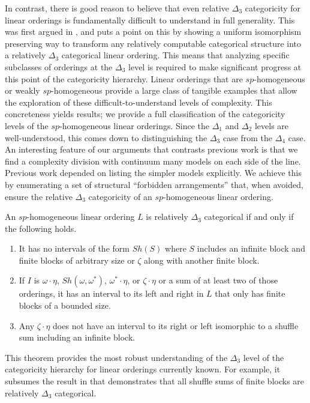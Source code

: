 \documentclass[11pt]{amsart}
\theoremstyle{definition}
\begin{document}
In contrast, there is good reason to believe that even relative $\Delta_3$ categoricity for linear orderings is fundamentally difficult to understand in full generality.
This was first argued in \cite{McCoy2002}, and \cite{GR23} puts a point on this by showing a uniform isomorphism preserving way to transform any relatively computable categorical structure into a relatively $\Delta_3$ categorical linear ordering.
This means that analyzing specific subclasses of orderings at the $\Delta_3$ level is required to make significant progress at this point of the categoricity hierarchy.
Linear orderings that are $sp$-homogeneous or weakly $sp$-homogeneous provide a large class of tangible examples that allow the exploration of these difficult-to-understand levels of complexity.
This concreteness yields results; we provide a full classification of the categoricity levels of the $sp$-homogeneous linear orderings.
Since the $\Delta_1$ and $\Delta_2$ levels are well-understood, this comes down to distinguishing the $\Delta_3$ case from the $\Delta_4$ case.
An interesting feature of our arguments that contrasts previous work is that we find a complexity division with continuum many models on each side of the line.
Previous work depended on listing the simpler models explicitly.
We achieve this by enumerating a set of structural ``forbidden arrangements'' that, when avoided, ensure the relative $\Delta_3$ categoricity of an $sp$-homogeneous linear ordering.
 \begin{theorem}
        An $sp$-homogeneous linear ordering $L$ is relatively $\Delta_3$ categorical if and only if the following holds. 
        \begin{enumerate}
            \item It has no intervals of the form $Sh(S)$ where $S$ includes an infinite block and finite blocks of arbitrary size or $\zeta$ along with another finite block.
            \item If $I$ is $\omega\cdot\eta$, $Sh(\omega,\omega^*)$, $\omega^*\cdot\eta$, or $\zeta\cdot\eta$ or a sum of at least two of those orderings, it has an interval to its left and right in $L$ that only has finite blocks of a bounded size.
            \item Any $\zeta\cdot\eta$ does not have an interval to its right or left isomorphic to a shuffle sum including an infinite block.
        \end{enumerate}
\end{theorem}
This theorem provides the most robust understanding of the $\Delta_3$ level of the categoricity hierarchy for linear orderings currently known.
For example, it subsumes the result in \cite{McCoy2002} that demonstrates that all shuffle sums of finite blocks are relatively $\Delta_3$ categorical.
\end{document}
